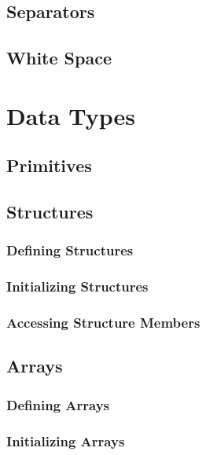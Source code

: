 \documentclass{article}
\begin{document}
\subsection{Separators}

\subsection{White Space}

\section{Data Types}

\subsection{Primitives}

\subsection{Structures}

\subsubsection{Defining Structures}

\subsubsection{Initializing Structures}

\subsubsection{Accessing Structure Members}

\subsection{Arrays}

\subsubsection{Defining Arrays}

\subsubsection{Initializing Arrays}
\end{document}
